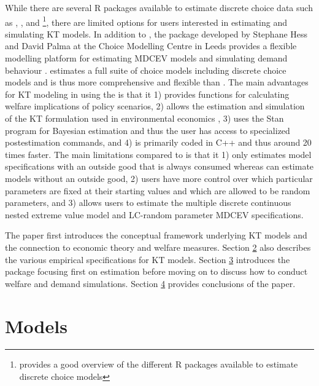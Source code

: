 While there are several R packages available to estimate discrete choice
data such as  \citep{hessapollo2019}, 
\citep{mlogit2019}, and 
\citep{sarriasmultinomial2017}\footnote{\citet{sarriasmultinomial2017}
  provides a good overview of the different R packages available to
  estimate discrete choice models}, there are limited options for users
interested in estimating and simulating KT models. In addition to
, the
\href{http://www.apollochoicemodelling.com/}{} package
developed by Stephane Hess and David Palma at the Choice Modelling
Centre in Leeds provides a flexible modelling platform for estimating
MDCEV models and simulating demand behaviour \citep{hessapollo2019}.
 estimates a full suite of choice models including discrete
choice models and is thus more comprehensive and flexible than
. The main advantages for KT modeling in using the
 is that it 1) provides functions for calculating welfare
implications of policy scenarios, 2) allows the estimation and
simulation of the KT formulation used in environmental economics
\citep{vonhaefenkuhn-tucker2005}, 3) uses the Stan program
\citep{carpenterstan2017} for Bayesian estimation and thus the user has
access to specialized postestimation commands, and 4) is primarily coded
in C++ and thus around 20 times faster. The main limitations
 compared to  is that it 1) only estimates model
specifications with an outside good that is always consumed whereas
 can estimate models without an outside good, 2) users have
more control over which particular parameters are fixed at their
starting values and which are allowed to be random parameters, and 3)
 allows users to estimate the multiple discrete continuous
nested extreme value model and LC-random parameter MDCEV specifications.

The paper first introduces the conceptual framework underlying KT models
and the connection to economic theory and welfare measures. Section
\protect\hyperlink{models}{2} also describes the various empirical
specifications for KT models. Section \protect\hyperlink{rmdcev}{3}
introduces the  package focusing first on estimation before
moving on to discuss how to conduct welfare and demand simulations.
Section \protect\hyperlink{conclusions}{4} provides conclusions of the
paper.

\hypertarget{models}{%
\section{Models}\label{models}}


